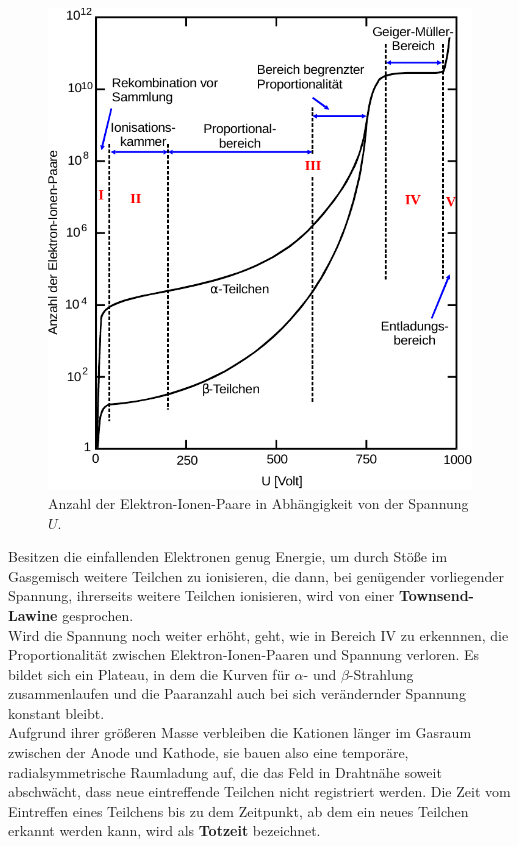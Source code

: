 \begin{figure}[H]
    \centering
    \includegraphics{figures/Abb_2.pdf}
    \caption{Anzahl der Elektron-Ionen-Paare in Abhängigkeit von der Spannung $U$\cite{ap03}.}
    \label{fig:abb2}
\end{figure}

Besitzen die einfallenden Elektronen genug
Energie, um durch Stöße im Gasgemisch weitere
Teilchen zu ionisieren, die dann, bei genügender
vorliegender Spannung, ihrerseits weitere
Teilchen ionisieren, wird von einer \textbf{Townsend-Lawine}
gesprochen. \\

Wird die Spannung noch weiter erhöht, geht,
wie in Bereich IV zu erkennnen, die
Proportionalität zwischen Elektron-Ionen-Paaren
und Spannung verloren.
Es bildet sich ein Plateau, in dem die Kurven
für $\alpha$- und $\beta$-Strahlung zusammenlaufen
und die Paaranzahl auch bei sich verändernder
Spannung konstant bleibt. \\

Aufgrund ihrer größeren Masse verbleiben die Kationen
länger im Gasraum zwischen der Anode und Kathode, sie bauen
also eine temporäre, radialsymmetrische Raumladung auf,
die das Feld in Drahtnähe soweit abschwächt,
dass neue eintreffende Teilchen nicht registriert werden.
Die Zeit vom Eintreffen eines Teilchens bis zu dem
Zeitpunkt, ab dem ein neues Teilchen erkannt werden kann,
wird als \textbf{Totzeit} bezeichnet. \\

